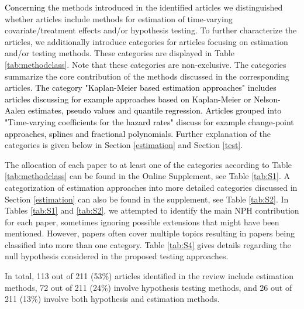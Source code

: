 \documentclass{article}
\newcommand{\NEW}[2][black]{\textcolor{#1}{#2}}
\begin{document}
\noindent \NEW{Concerning} the methods introduced in the identified articles we distinguished whether articles include methods for estimation of time-varying covariate/treatment effects and/or hypothesis testing. 
To further characterize the articles, we additionally introduce categories for articles focusing on estimation and/or testing methods. These categories are displayed in Table \ref{tab:methodclass}. Note that these categories are non-exclusive.
The categories summarize the core contribution of the methods discussed in the corresponding articles.
\NEW{The category "Kaplan-Meier based estimation approaches" includes articles discussing for example approaches based on Kaplan-Meier or Nelson-Aalen estimates, pseudo values and quantile regression. Articles grouped into "Time-varying coefficients for the hazard rates" discuss for example change-point approaches, splines and fractional polynomials. Further} explanation of the categories is given below in Section \ref{estimation} and Section \ref{test}.

\noindent The allocation of each paper to at least one of the categories according to Table \ref{tab:methodclass} can be found in the Online Supplement, see Table \ref{tab:S1}. 
A categorization of estimation approaches into more detailed categories discussed in Section \ref{estimation} can also be found in the supplement, see Table \ref{tab:S2}.
\noindent In Tables \ref{tab:S1} and \ref{tab:S2}, we attempted to identify the main NPH contribution for each paper, sometimes ignoring possible extensions that might have been mentioned. However, papers often cover multiple topics resulting in papers being classified into more than one category. Table \ref{tab:S4} gives details regarding the null hypothesis considered in the proposed testing approaches.

\noindent In total, 113 out of 211 (53\%) articles identified in the review include estimation methods, 72 out of 211 (24\%) involve hypothesis testing methods, and 26 out of 211 (13\%) involve both hypothesis and estimation methods. 
\end{document}
